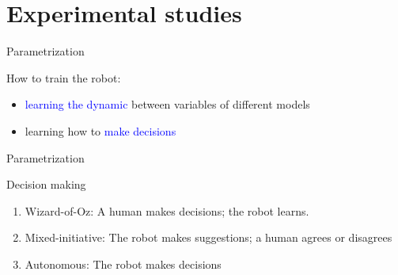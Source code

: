 \documentclass[compress]{beamer}
\renewcommand{\bf}{\Medium}
\begin{document}

\section*{Experimental studies}

\begin{frame}{Parametrization}

{\bf How to train the robot}:
\begin{itemize}
\item \textcolor{blue}{learning the dynamic} between variables of different models
\item learning how to \textcolor{blue}{make decisions}
\end{itemize}
\end{frame}

\begin{frame}{Parametrization}

{\bf Decision making}
\begin{enumerate}
\item {\bf Wizard-of-Oz}: A human makes decisions; the robot learns. %
\item {\bf Mixed-initiative}: The robot makes suggestions; a human agrees or disagrees
\item {\bf Autonomous}: The robot makes decisions
\end{enumerate}
\end{frame}
\end{document}

